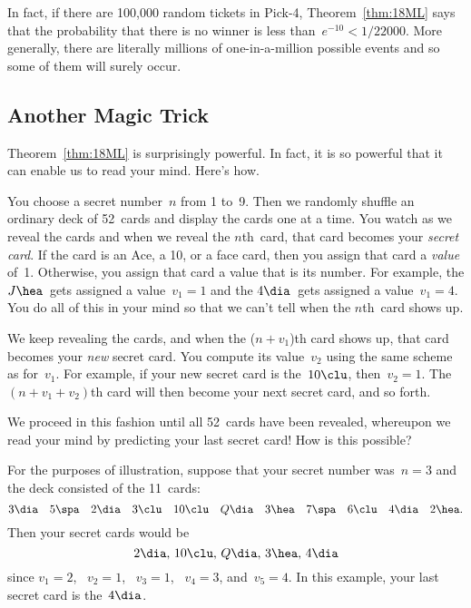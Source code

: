In fact, if there are 100,000 random tickets in Pick-4,
Theorem~\ref{thm:18ML} says that the probability that there is no
winner is less than~$e^{-10} < 1/22000$.  More generally, there are
literally millions of one-in-a-million possible events and so some of
them will surely occur.

\subsection{Another Magic Trick}

Theorem~\ref{thm:18ML} is surprisingly powerful.  In fact, it is so
powerful that it can enable us to read your mind.  Here's how.

You choose a secret number~$n$ from 1 to~9.  Then we randomly shuffle
an ordinary deck of 52~cards and display the cards one at a time.  You
watch as we reveal the cards and when we reveal the $n$th~card, that
card becomes your \emph{secret card}.  If the card is an Ace, a 10, or
a face card, then you assign that card a \emph{value} of~1.
Otherwise, you assign that card a value that is its number.  For
example, the $J\hea$~gets assigned a value~$v_1 = 1$ and the $4
\dia$~gets assigned a value~$v_1 = 4$. You do all of this in your mind
so that we can't tell when the $n$th~card shows up.

We keep revealing the cards, and when the ($n + v_1$)th card shows up,
that card becomes your \emph{new} secret card.  You compute its
value~$v_2$ using the same scheme as for~$v_1$.  For example, if your
new secret card is the~$10 \clu$, then~$v_2 = 1$.  The $(n + v_1 +
v_2)$th card will then become your next secret card, and so forth.

We proceed in this fashion until all 52~cards have been revealed,
whereupon we read your mind by predicting your last secret card!  How
is this possible?

For the purposes of illustration, suppose that your secret number
was~$n = 3$ and the deck consisted of the 11~cards:
\begin{equation*}
    3\dia \quad 5\spa \quad 2\dia \quad 3\clu \quad 10\clu
    \quad Q\dia \quad 3\hea \quad 7\spa \quad 6\clu
    \quad 4\dia \quad 2\hea.
\end{equation*}
Then your secret cards would be
\begin{equation*}
    2\dia, \, 10\clu, \, Q\dia, \, 3\hea, \, 4\dia
\end{equation*}
since $v_1 = 2$, \ $v_2 = 1$, \ $v_3 = 1$, \ $v_4 = 3$, and~$v_5 =
4$.  In this example, your last secret card is the~$4\dia$.


